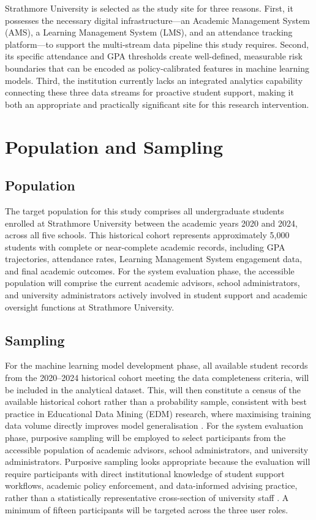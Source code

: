 \documentclass[12pt]{report}
\begin{document}
Strathmore University is selected as the study site for three reasons. First, it
possesses the necessary digital infrastructure---an Academic Management System
(AMS), a Learning Management System (LMS), and an attendance tracking
platform---to support the multi-stream data pipeline this study requires. Second, its
specific attendance and GPA thresholds create well-defined, measurable risk boundaries
that can be encoded as policy-calibrated features in machine learning models. Third,
the institution currently lacks an integrated analytics capability connecting these three
data streams for proactive student support, making it both an appropriate and
practically significant site for this research intervention.

\section{Population and Sampling}

\subsection{Population}

The target population for this study comprises all undergraduate students enrolled at
Strathmore University between the academic years 2020 and 2024, across all five
schools. This historical cohort represents approximately 5,000 students with complete
or near-complete academic records, including GPA trajectories, attendance rates,
Learning Management System engagement data, and final academic outcomes. For
the system evaluation phase, the accessible population will comprise the current academic
advisors, school administrators, and university administrators actively involved in
student support and academic oversight functions at Strathmore University.

\subsection{Sampling}

For the machine learning model development phase, all available student records from the
 2020--2024 historical cohort meeting the data completeness criteria,
  will be included in the analytical dataset. This, will then constitute a census of the available 
  historical cohort rather than a probability sample, consistent with best practice in 
  Educational Data Mining (EDM) research, where maximising training data volume directly 
  improves model generalisation \parencite{bettahi2025}.
For the system evaluation phase, purposive sampling will be employed to select participants
 from the accessible population of academic advisors, school administrators, and university 
 administrators. Purposive sampling looks appropriate because the evaluation will require participants 
 with direct institutional knowledge of student support workflows, academic policy enforcement,
  and data-informed advising practice, rather than a statistically representative cross-section
   of university staff \parencite{kwakye2025}. A minimum of fifteen participants will be 
   targeted across the three user roles.
   
\end{document}
